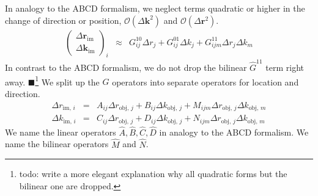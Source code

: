 \documentclass[12pt,a4paper,twoside,openright,BCOR10mm,headsepline,titlepage,abstracton,chapterprefix,final]{scrreprt}
\newcommand\Vector[1]{{\mathbf{#1}}}
\newcommand\wavenumber{k}
\newcommand\Wavevector{\Vector{\wavenumber}}
\newcommand{\remark}[1]{{\color{red}$\blacksquare$}\footnote{{\color{red}#1}}}
\newcommand{\orderof}[1]{\mathcal{O}(#1)}
\newcommand\im{\textrm{im}}
\newcommand\obj{\textrm{obj}}
\begin{document}
In analogy to the ABCD formalism, we neglect terms quadratic or higher in the change of direction or position, 
$\orderof{\Delta\Wavevector^2}$ and $\orderof{\Delta\Vector{r}^2}$.
\begin{eqnarray}
 \begin{pmatrix}
  \Delta \Vector{r}_\im \\ \Delta \Wavevector_\im
 \end{pmatrix}_i
 &\approx&
   G^{10}_{ij} \Delta r_j
 + G^{01}_{ij} \Delta k_j
 + G^{11}_{ijm} \Delta r_j \Delta k_m
\end{eqnarray}
In contrast to the ABCD formalism, we do not drop the bilinear $\hat{G}^{11}$ term right away.
\remark{todo: write a more elegant explanation why all quadratic forms but the bilinear one are dropped.}
We split up the $\hat{G}$ operators into separate operators for location and direction.
\begin{eqnarray}
 \Delta r_{\im,\,i}  &=& A_{ij} \Delta r_{\obj,\,j} + B_{ij} \Delta k_{\obj,\,j} + M_{ijm} \Delta r_{\obj,\,j} \Delta k_{\obj,\,m} \\ 
 \Delta \wavenumber_{\im,\,i} &=& C_{ij} \Delta r_{\obj,\,j} + D_{ij} \Delta k_{\obj,\,j} + N_{ijm} \Delta r_{\obj,\,j} \Delta k_{\obj,\,m}
\end{eqnarray}
We name the linear operators $\hat{A}, \hat{B}, \hat{C}, \hat{D}$ in analogy to the ABCD formalism.
We name the bilinear operators $\hat{M}$ and $\hat{N}$.
\end{document}
